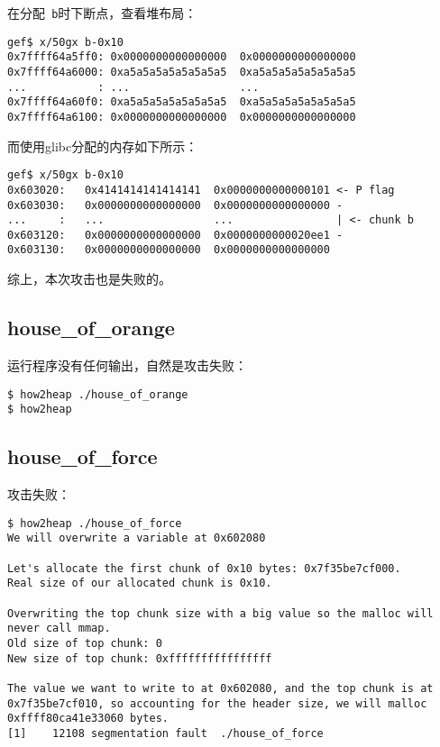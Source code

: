 在分配\verb+ b+时下断点，查看堆布局：
\begin{verbatim}
gef$ x/50gx b-0x10
0x7ffff64a5ff0: 0x0000000000000000  0x0000000000000000
0x7ffff64a6000: 0xa5a5a5a5a5a5a5a5  0xa5a5a5a5a5a5a5a5
...           : ...                 ...
0x7ffff64a60f0: 0xa5a5a5a5a5a5a5a5  0xa5a5a5a5a5a5a5a5
0x7ffff64a6100: 0x0000000000000000  0x0000000000000000
\end{verbatim}

而使用glibc分配的内存如下所示：
\begin{verbatim}
gef$ x/50gx b-0x10
0x603020:   0x4141414141414141  0x0000000000000101 <- P flag
0x603030:   0x0000000000000000  0x0000000000000000 -
...     :   ...                 ...                | <- chunk b
0x603120:   0x0000000000000000  0x0000000000020ee1 -
0x603130:   0x0000000000000000  0x0000000000000000
\end{verbatim}

综上，本次攻击也是失败的。

\subsection{house\_of\_orange}

运行程序没有任何输出，自然是攻击失败：
\begin{verbatim}
$ how2heap ./house_of_orange
$ how2heap 

\end{verbatim}

\subsection{house\_of\_force}

攻击失败：

\begin{verbatim}
$ how2heap ./house_of_force 
We will overwrite a variable at 0x602080

Let's allocate the first chunk of 0x10 bytes: 0x7f35be7cf000.
Real size of our allocated chunk is 0x10.

Overwriting the top chunk size with a big value so the malloc will never call mmap.
Old size of top chunk: 0
New size of top chunk: 0xffffffffffffffff

The value we want to write to at 0x602080, and the top chunk is at 0x7f35be7cf010, so accounting for the header size, we will malloc 0xffff80ca41e33060 bytes.
[1]    12108 segmentation fault  ./house_of_force

\end{verbatim}

